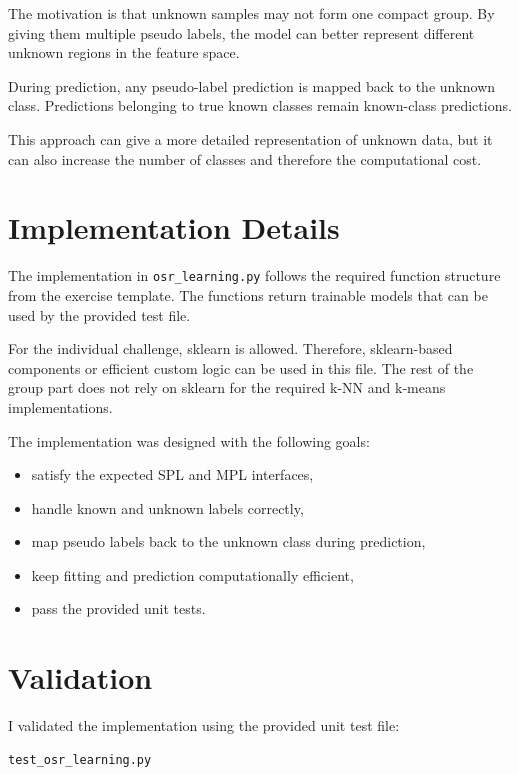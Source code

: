 \documentclass[11pt,a4paper]{article}
\begin{document}
The motivation is that unknown samples may not form one compact group. By giving them multiple pseudo labels, the model can better represent different unknown regions in the feature space.

During prediction, any pseudo-label prediction is mapped back to the unknown class. Predictions belonging to true known classes remain known-class predictions.

This approach can give a more detailed representation of unknown data, but it can also increase the number of classes and therefore the computational cost.

\section{Implementation Details}

The implementation in \texttt{osr\_learning.py} follows the required function structure from the exercise template. The functions return trainable models that can be used by the provided test file.

For the individual challenge, sklearn is allowed. Therefore, sklearn-based components or efficient custom logic can be used in this file. The rest of the group part does not rely on sklearn for the required k-NN and k-means implementations.

The implementation was designed with the following goals:

\begin{itemize}[noitemsep]
    \item satisfy the expected SPL and MPL interfaces,
    \item handle known and unknown labels correctly,
    \item map pseudo labels back to the unknown class during prediction,
    \item keep fitting and prediction computationally efficient,
    \item pass the provided unit tests.
\end{itemize}

\section{Validation}

I validated the implementation using the provided unit test file:

\begin{lstlisting}
test_osr_learning.py
\end{lstlisting}
\end{document}
